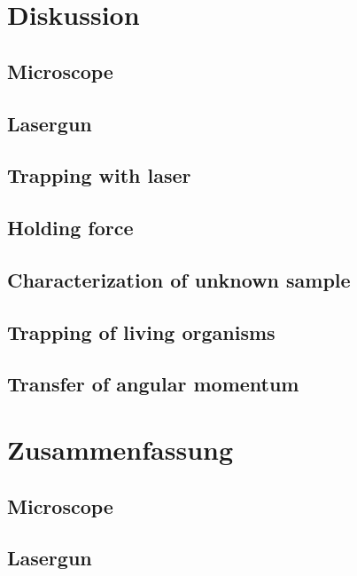 \documentclass[12pt,english,ngerman]{scrartcl}
\begin{document}
\section{Diskussion}\label{sec:diskussion}

\subsection{Microscope}

\subsection{Lasergun}


\subsection{Trapping with laser}


\subsection{Holding force}


\subsection{Characterization of unknown sample}



\subsection{Trapping of living organisms}


\subsection{Transfer of angular momentum}






\section{Zusammenfassung}\label{sec:zusammenfassung}

\subsection{Microscope}

\subsection{Lasergun}
\end{document}
